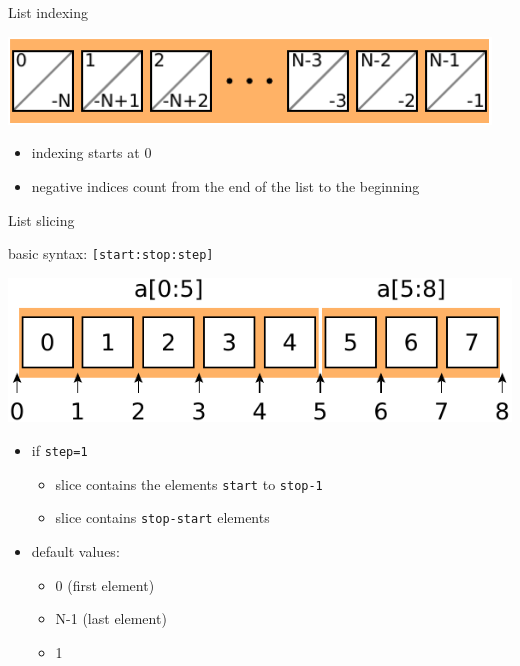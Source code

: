 \documentclass[svgnames]{beamer}
\begin{document}
\begin{frame}{List indexing}
 \begin{center}
  \includegraphics[width=0.96\textwidth]{listindexing2}
 \end{center}
 \begin{itemize}
  \item indexing starts at 0
  \item negative indices count from the end of the list to the beginning
 \end{itemize}
\end{frame}

\begin{frame}{List slicing}

 basic syntax: \texttt{[start:stop:step]}

 \vspace{0.2truecm}
 \begin{center}
  \includegraphics[width=\textwidth]{listindexing1}
 \end{center}
 \begin{itemize}
  \item if \texttt{step=1}
  \begin{itemize}
      \item slice contains the elements \texttt{start} to \texttt{stop-1}
      \item slice contains \texttt{stop-start} elements
  \end{itemize}
  \item default values:
  \begin{itemize}
      \item {} 0 (first element)
      \item {} N-1 (last element)
      \item {} 1
  \end{itemize}
 \end{itemize}
\end{frame}
\end{document}
